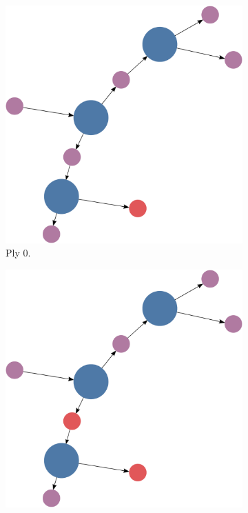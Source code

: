 \documentclass[titlepage,11pt]{article}
\begin{document}
\begin{figure}[!htb]
	\centering
	\begin{subfigure}[!htb]{0.19\textwidth}
		\centering
		\includegraphics[width=\columnwidth]{figures/knn_simple_lambda_think_0.pdf}
		\caption{Ply 0.}
	\end{subfigure}
	\begin{subfigure}[!htb]{0.19\textwidth}
		\centering
		\includegraphics[width=\columnwidth]{figures/knn_simple_lambda_think_1.pdf}

\end{subfigure}
\end{figure}
\end{document}
